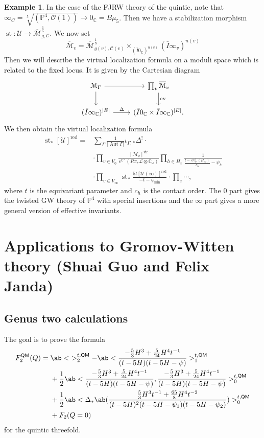 \documentclass[10pt]{amsart}
\theoremstyle{definition}
\newtheorem{exm}[thm]{Example}
\theoremstyle{remark}
\theoremstyle{plain}
\theoremstyle{definition}
\theoremstyle{remark}
\newcommand{\C}{\mathbb{C}}
\renewcommand{\P}{\mathbb{P}}
\newcommand{\Mbar}{\overline{\mathcal{M}}}
\newcommand{\mc}[1]{\mathcal{#1}}
\newcommand{\mr}[1]{\mathrm{#1}}
\newcommand{\on}[1]{\operatorname{#1}}
\newcommand{\ms}[1]{\mathsf{#1}}
\newcommand{\1}{\mathbf{1}}
\newcommand{\2}{\mathbf{2}}
\newcommand{\3}{\mathbf{3}}
\newcommand{\vir}{\mr{vir}}
\newcommand{\red}{\mr{red}}
\newcommand{\QM}{\ms{QM}}
\DeclareMathOperator{\Aut}{Aut}
\DeclareMathOperator{\ev}{ev}
\begin{document}
\begin{exm}
    In the case of the FJRW theory of the quintic, note that $\infty_C = \sqrt[5]{(\P^4, \mc{O}(1))} \to 0_{\C} = B\mu_5$. Then we have a stabilization morphism $\on{st} \colon\mc{U} \to \Mbar^{\frac{1}{5}}_{g,\mc{C}}$. We now set
    \[ \Mbar_v = \Mbar^{\frac{1}{5}}_{g(v), \mc{C}(v)} \times_{( \bar{I}0_{\C} )^{n(v)}} (\bar{I}\infty_{v})^{n(v)} \]
    Then we will describe the virtual localization formula on a moduli space which is related to the fixed locus. It is given by the Cartesian diagram
    \begin{equation*}
    \begin{tikzcd}
        \mc{M}_{\Gamma} \ar{r} \ar{d} & \prod_v \Mbar_v \ar{d}{\ev} \\
        (\bar{I}\infty_{\C})^{|E|} \ar{r}{\Delta} & (\bar{I}0_{\C} \times \bar{I}\infty_{\C})^{|E|}.
    \end{tikzcd}
    \end{equation*}
    We then obtain the virtual localization formula
    \begin{align*}
        \on{st}_* [\mc{U}]^{\red} ={}& \sum_{\Gamma} \frac{1}{|\Aut \Gamma|} \iota_{\Gamma,*} \Delta^! \cdot \\
        &\cdot \prod_{v \in V_0} \frac{[\mc{M}_v]^{\vir}}{e^{\C^{\times}}(R\pi_* \mc{L} \otimes \C_{\omega})} \prod_{h \in H_v} \frac{1}{\frac{ t-\ev_h^*(H_{\infty}) }{c_h} - \psi_h} \\
        &\cdot \prod_{v \in V_{\infty}} \on{st}_* \frac{5t [\mc{U}(\infty)]^{\red}}{-t-\psi_{\min}} 
        \cdot \prod_{e} \cdots,
    \end{align*}
    where $t$ is the equivariant parameter and $c_h$ is the contact order. The $0$ part gives the twisted GW theory of $\P^4$ with special insertions and the $\infty$ part gives a more general version of effective invariants.
\end{exm}


\section{Applications to Gromov-Witten theory (Shuai Guo and Felix Janda)}%
\label{sec:Calculationslogglsm}

\subsection{Genus two calculations}%
\label{sub:Genus two calculations}

The goal is to prove the formula
\begin{align}
    F_2^{\QM}(Q) ={}& \ab<\ >_2^{t,\QM} - \ab< \frac{-\frac{5}{3}H^3 + \frac{5}{24}H^4t^{-1}}{(t-5H)(t-5H-\psi)}>_1^{t,\QM} \\
    &+ \frac{1}{2} \ab<\frac{-\frac{5}{3}H^3 + \frac{5}{24}H^4 t^{-1}}{(t-5H)(t-5H-\psi)}, \frac{-\frac{5}{3}H^3 + \frac{5}{24}H^4 t^{-1}}{(t-5H)(t-5H-\psi)}>_0^{t,\QM} \label{eqn:c} \\
    &+ \frac{1}{2} \ab<\Delta_* \ab(\frac{\frac{5}{3} H^3 t^{-1}+ \frac{65}{8}H^4 t^{-2}}{(t-5H)^2(t-5H-\psi_1)(t-5H-\psi_2)})>_0^{t,\QM} \label{eqn:d} \\
    &+ F_2(Q=0)
\end{align}
for the quintic threefold.
\end{document}
